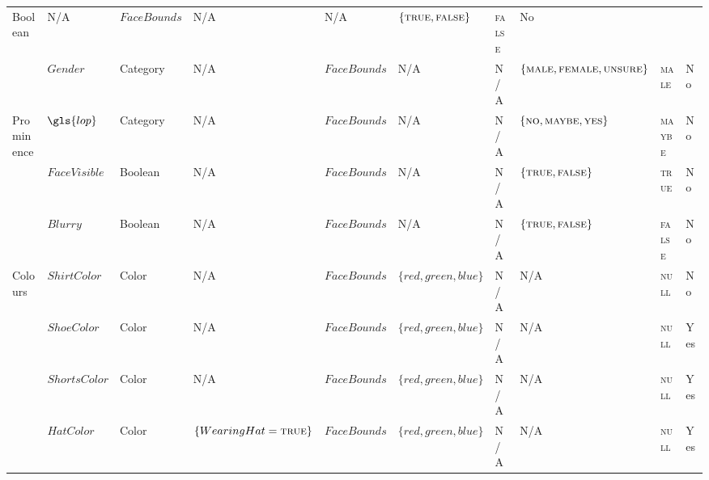 \begin{landscape}
\begin{table}[p]
{\begin{tabular}{llllllllll}
        Boolean &
        N/A &
        $FaceBounds$ &
        N/A &
        N/A &
        $\{ \textsc{true}, \textsc{false} \}$&
        \textsc{false} &
        No
      \\
        &
        $Gender$ &
        Category &
        N/A &
        $FaceBounds$ &
        N/A &
        N/A &
        $\{ \textsc{male}, \textsc{female}, \textsc{unsure} \} $ &
        \textsc{male} &
        No
      \\
      \midrule
        \multirow{2}{*}{Prominence} &
        $\gls{lop}$ &
        Category &
        N/A &
        $FaceBounds$ &
        N/A &
        N/A &
        $\{ \textsc{no}, \textsc{maybe}, \textsc{yes} \}$ &
        \textsc{maybe} &
        No
      \\
        &
        $FaceVisible$ &
        Boolean &
        N/A &
        $FaceBounds$ &
        N/A &
        N/A &
        $\{ \textsc{true}, \textsc{false} \}$&
        \textsc{true} &
        No
      \\
        &
        $Blurry$ &
        Boolean &
        N/A &
        $FaceBounds$ &
        N/A &
        N/A &
        $\{ \textsc{true}, \textsc{false} \}$&
        \textsc{false} &
        No
      \\
      \midrule
        \multirow{2}{*}{Colours} &
        $ShirtColor$ &
        Color &
        N/A &
        $FaceBounds$ &
        $\{ red, green, blue \}$ &
        N/A &
        N/A &
        \textsc{null} &
        No
      \\
        &
        $ShoeColor$ &
        Color &
        N/A &
        $FaceBounds$ &
        $\{ red, green, blue \}$ &
        N/A &
        N/A &
        \textsc{null} &
        Yes
      \\
        &
        $ShortsColor$ &
        Color &
        N/A &
        $FaceBounds$ &
        $\{ red, green, blue \}$ &
        N/A &
        N/A &
        \textsc{null} &
        Yes
      \\
        &
        $HatColor$ &
        Color &
        $\{ WearingHat = \textsc{true} \}$ &
        $FaceBounds$ &
        $\{ red, green, blue \}$ &
        N/A &
        N/A &
        \textsc{null} &
        Yes
      \\
      \bottomrule
    \end{tabular}
  }
\end{table}

\end{landscape}